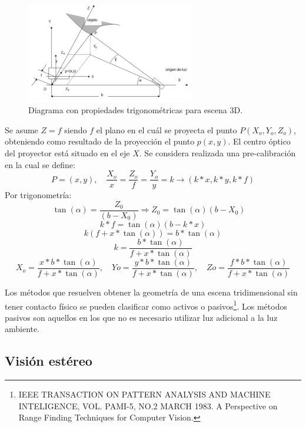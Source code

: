 \begin{figure}[H]
  \centering
    \includegraphics[width=0.65\textwidth]{./Cap6_reconstruccion/triangulacion-2.PNG}
  \caption{Diagrama con propiedades trigonométricas para escena 3D.}
  \label{fig:Triangulacion2}
\end{figure}

Se asume $Z = f$ siendo $f$ el plano en el cuál se proyecta el punto $P(X_o, Y_o, Z_o)$, obteniendo como resultado de la proyección el punto $p(x,y)$.
El centro óptico del proyector está situado en el eje $X$.
Se considera realizada una pre-calibración en la cual se define:
\[
P = (x,y), \quad \frac{X_o}{x} = \frac{Z_o}{f} = \frac{Y_o}{y} = k \to (k * x,k * y,k * f)
\]
Por trigonometría:
\[
\tan (\alpha) = \frac{Z_0}{(b - X_0)} \Rightarrow Z_0 = \tan (\alpha) (b - X_0) \quad 
\]
\[
k * f = \tan (\alpha)(b - k * x)
\]
\[
k (f + x * \tan (\alpha)) = b * \tan (\alpha)
\]
\[
k = \frac	{b * \tan (\alpha)}{f + x * \tan (\alpha)}
\]
\[
X_o = \frac{x * b * \tan (\alpha)}{f + x * \tan (\alpha)}, \quad Yo = \frac{y * b * \tan (\alpha)}{f + x * \tan (\alpha)},\quad Zo = \frac{f * b * \tan (\alpha)}{f + x * \tan (\alpha)}
\]


Los métodos que resuelven obtener la geometría de una escena tridimensional sin tener contacto físico se pueden clasificar como activos o pasivos\footnote{IEEE TRANSACTION ON PATTERN ANALYSIS AND MACHINE INTELIGENCE, VOL. PAMI-5, NO.2 MARCH 1983. A Perspective on Range Finding Techniques for Computer Vision.}.
Los métodos pasivos son aquellos en los que no es necesario utilizar luz adicional a la luz ambiente.

\subsection{Visión estéreo}

